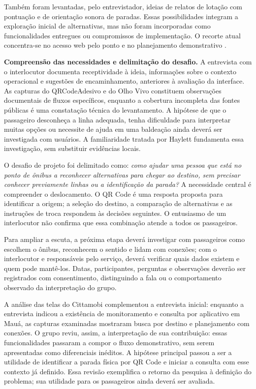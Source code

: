 \documentclass[12pt,oneside,a4paper,brazil]{abntex2}
\begin{document}
Também foram levantadas, pelo entrevistador, ideias de relatos de lotação com pontuação e de orientação sonora de paradas. Essas possibilidades integram a exploração inicial de alternativas, mas não foram incorporadas como funcionalidades entregues ou compromissos de implementação. O recorte atual concentra-se no acesso web pelo ponto e no planejamento demonstrativo \citep[112--153 s; 1647--1785 s]{entrevistaosmar2026}.


\textbf{Compreensão das necessidades e delimitação do desafio.} A entrevista com o interlocutor documenta receptividade à ideia, informações sobre o contexto operacional e sugestões de encaminhamento, anteriores à avaliação da interface. As capturas do QRCodeAdesivo e do Olho Vivo constituem observações documentais de fluxos específicos, enquanto a cobertura incompleta das fontes públicas é uma constatação técnica do levantamento. A hipótese de que o passageiro desconheça a linha adequada, tenha dificuldade para interpretar muitas opções ou necessite de ajuda em uma baldeação ainda deverá ser investigada com usuários. A familiaridade tratada por Haylett fundamenta essa investigação, sem substituir evidências locais.

O desafio de projeto foi delimitado como: \textit{como ajudar uma pessoa que está no ponto de ônibus a reconhecer alternativas para chegar ao destino, sem precisar conhecer previamente linhas ou a identificação da parada?} A necessidade central é compreender o deslocamento. O QR Code é uma resposta proposta para identificar a origem; a seleção do destino, a comparação de alternativas e as instruções de troca respondem às decisões seguintes. O entusiasmo de um interlocutor não confirma que essa combinação atende a todos os passageiros.

Para ampliar a escuta, a próxima etapa deverá investigar com passageiros como escolhem o ônibus, reconhecem o sentido e lidam com conexões; com o interlocutor e responsáveis pelo serviço, deverá verificar quais dados existem e quem pode mantê-los. Datas, participantes, perguntas e observações deverão ser registrados com consentimento, distinguindo a fala ou o comportamento observado da interpretação do grupo.

A análise das telas do Cittamobi complementou a entrevista inicial: enquanto a entrevista indicou a existência de monitoramento e consulta por aplicativo em Mauá, as capturas examinadas mostraram busca por destino e planejamento com conexões. O grupo reviu, assim, a interpretação de sua contribuição: essas funcionalidades passaram a compor o fluxo demonstrativo, sem serem apresentadas como diferenciais inéditos. A hipótese principal passou a ser a utilidade de identificar a parada física por QR Code e iniciar a consulta com esse contexto já definido. Essa revisão exemplifica o retorno da pesquisa à definição do problema; sua utilidade para os passageiros ainda deverá ser avaliada.
\end{document}
